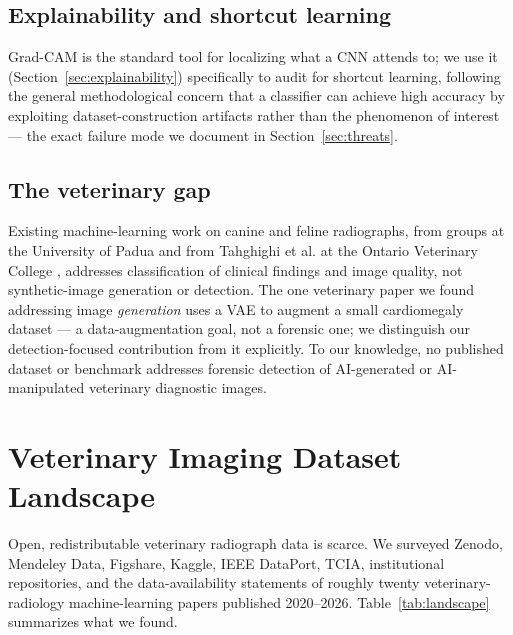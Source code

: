 \documentclass[journal]{IEEEtran}
\begin{document}
\subsection{Explainability and shortcut learning}
Grad-CAM \cite{gradcam_2017} is the standard tool for localizing what a CNN attends to; we use it (Section~\ref{sec:explainability}) specifically to audit for shortcut learning, following the general methodological concern that a classifier can achieve high accuracy by exploiting dataset-construction artifacts rather than the phenomenon of interest — the exact failure mode we document in Section~\ref{sec:threats}.

\subsection{The veterinary gap}
Existing machine-learning work on canine and feline radiographs, from groups at the University of Padua \cite{vetxray_canine_2021,vetxray_cardio_2020,vetxray_quality_2023,vetxray_feline_2021} and from Tahghighi et al. at the Ontario Veterinary College \cite{vet_quality_2024,vet_symmetry_2023}, addresses classification of clinical findings and image quality, not synthetic-image generation or detection. The one veterinary paper we found addressing image \emph{generation} uses a VAE to augment a small cardiomegaly dataset \cite{vet_vae_2024} — a data-augmentation goal, not a forensic one; we distinguish our detection-focused contribution from it explicitly. To our knowledge, no published dataset or benchmark addresses forensic detection of AI-generated or AI-manipulated veterinary diagnostic images.

\section{Veterinary Imaging Dataset Landscape}
\label{sec:landscape}

Open, redistributable veterinary radiograph data is scarce. We surveyed Zenodo, Mendeley Data, Figshare, Kaggle, IEEE DataPort, TCIA, institutional repositories, and the data-availability statements of roughly twenty veterinary-radiology machine-learning papers published 2020--2026. Table~\ref{tab:landscape} summarizes what we found.
\end{document}

